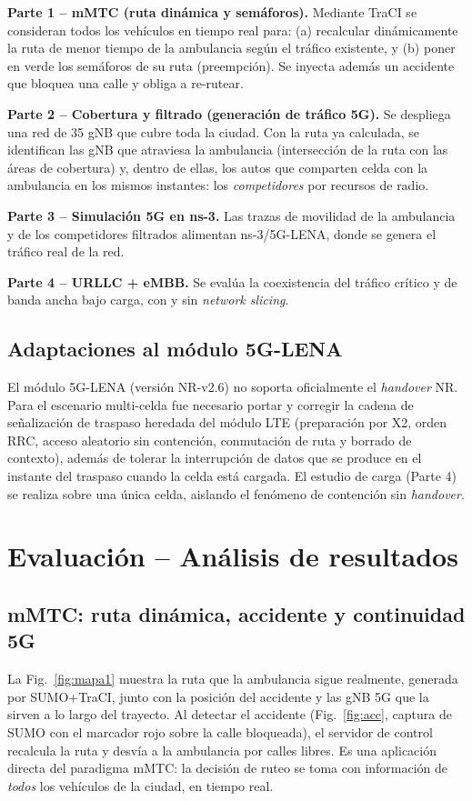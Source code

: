 \documentclass[conference,onecolumn]{IEEEtran}
\begin{document}
\textbf{Parte 1 -- mMTC (ruta dinámica y semáforos).} Mediante TraCI se
consideran todos los vehículos en tiempo real para: (a) recalcular
dinámicamente la ruta de menor tiempo de la ambulancia según el tráfico
existente, y (b) poner en verde los semáforos de su ruta (preempción). Se
inyecta además un accidente que bloquea una calle y obliga a re-rutear.

\textbf{Parte 2 -- Cobertura y filtrado (generación de tráfico 5G).} Se despliega
una red de 35 gNB que cubre toda la ciudad. Con la ruta ya calculada, se
identifican las gNB que atraviesa la ambulancia (intersección de la ruta con las
áreas de cobertura) y, dentro de ellas, los autos que comparten celda con la
ambulancia en los mismos instantes: los \textit{competidores} por recursos de
radio.

\textbf{Parte 3 -- Simulación 5G en ns-3.} Las trazas de movilidad de la
ambulancia y de los competidores filtrados alimentan ns-3/5G-LENA, donde se
genera el tráfico real de la red.

\textbf{Parte 4 -- URLLC + eMBB.} Se evalúa la coexistencia del tráfico crítico
y de banda ancha bajo carga, con y sin \textit{network slicing}.

\subsection{Adaptaciones al módulo 5G-LENA}
El módulo 5G-LENA (versión NR-v2.6) no soporta oficialmente el \textit{handover}
NR. Para el escenario multi-celda fue necesario portar y corregir la cadena de
señalización de traspaso heredada del módulo LTE (preparación por X2, orden RRC,
acceso aleatorio sin contención, conmutación de ruta y borrado de contexto),
además de tolerar la interrupción de datos que se produce en el instante del
traspaso cuando la celda está cargada. El estudio de carga (Parte 4) se realiza
sobre una única celda, aislando el fenómeno de contención sin \textit{handover}.

\section{Evaluación -- Análisis de resultados}

\subsection{mMTC: ruta dinámica, accidente y continuidad 5G}
La Fig.~\ref{fig:mapa1} muestra la ruta que la ambulancia sigue realmente,
generada por SUMO+TraCI, junto con la posición del accidente y las gNB 5G que la
sirven a lo largo del trayecto. Al detectar el accidente (Fig.~\ref{fig:acc},
captura de SUMO con el marcador rojo sobre la calle bloqueada), el servidor de
control recalcula la ruta y desvía a la ambulancia por calles libres. Es una
aplicación directa del paradigma mMTC: la decisión de ruteo se toma con
información de \textit{todos} los vehículos de la ciudad, en tiempo real.
\end{document}
